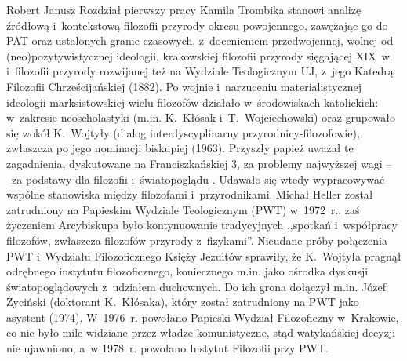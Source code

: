 \begin{newrevplenv}{Robert Janusz}
Rozdział pierwszy pracy Kamila Trombika stanowi analizę źródłową i~kontekstową filozofii przyrody okresu powojennego, zawężając go do PAT oraz ustalonych granic czasowych, z~docenieniem przedwojennej, wolnej od (neo)pozytywistycznej ideologii, krakowskiej filozofii przyrody sięgającej XIX~w. i~filozofii przyrody rozwijanej też na Wydziale Teologicznym UJ, z~jego Katedrą Filozofii Chrześcijańskiej (1882). Po wojnie i~narzuceniu materialistycznej ideologii marksistowskiej wielu filozofów działało w~środowiskach katolickich: w~zakresie neoscholastyki (m.in. K.~Kłósak i~T.~Wojciechowski) oraz grupowało się wokół K.~Wojtyły (dialog interdyscyplinarny przyrodnicy-filozofowie), zwłaszcza po jego nominacji biskupiej (1963). Przyszły papież uważał te zagadnienia, dyskutowane na Franciszkańskiej 3, za problemy najwyższej wagi --~za podstawy dla filozofii i~światopoglądu
\parencite[][s.~71–73, 83–84]{trombik_koncepcje_2021}. %
 Udawało się wtedy wypracowywać wspólne stanowiska między filozofami i~przyrodnikami. Michał Heller został zatrudniony na Papieskim Wydziale Teologicznym (PWT) w~1972~r., zaś życzeniem Arcybiskupa było kontynuowanie tradycyjnych ,,spotkań i~współpracy filozofów, zwłaszcza filozofów przyrody z~fizykami''. Nieudane próby połączenia PWT i~Wydziału Filozoficznego Księży Jezuitów sprawiły, że K.~Wojtyła pragnął odrębnego instytutu filozoficznego, koniecznego m.in. jako ośrodka dyskusji światopoglądowych z~udziałem duchownych. Do ich grona dołączył m.in. Józef Życiński (doktorant K.~Kłósaka), który został zatrudniony na PWT jako asystent (1974). W~1976~r. powołano Papieski Wydział Filozoficzny w~Krakowie, co nie było mile widziane przez władze komunistyczne, stąd watykańskiej decyzji nie ujawniono, a~w 1978~r. powołano Instytut Filozofii przy PWT.


\end{newrevplenv}
